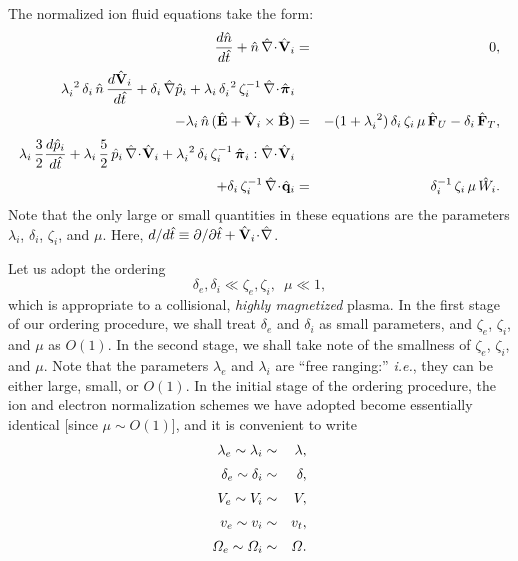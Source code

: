 The normalized ion fluid equations take the form:
\begin{eqnarray}\label{e3.116a}
\frac{d\hat{n}}{d\hat{t}} + \hat{n}\,\hat{\nabla}\!\cdot\!\hat{\bf V}_i &=&0,\\[0.5ex]
\lambda_i^{~2}\,\delta_i\,\hat{n}\,\frac{d\hat{\bf V}_i}{d\hat{t}} + \delta_i\,
\hat{\nabla}\hat{p}_i+ \lambda_i\,\delta_i^{~2}\,\zeta_i^{-1}\,\hat{\nabla}
\!\cdot\!\hat{\bpi}_i  \\[0.5ex]
-\lambda_i\,\hat{n}\,(\hat{\bf E} + \hat{\bf V}_i
\times\hat{\bf B}) &=& -(1+\lambda_i^{~2})\,\delta_i\,\zeta_i\,\mu\,\hat{\bf F}_U
 - \delta_i
\,\hat{\bf F}_T, \nonumber\\[0.5ex]
\lambda_i\,\frac{3}{2}\frac{d\hat{p}_i}{d\hat{t}} + \lambda_i\,\frac{5}{2}\,
\hat{p}_i\,\hat{\nabla}\!\cdot\!\hat{\bf V}_i + \lambda_i^{~2}\,\delta_i\,
\zeta_i^{-1}\,\hat{\bpi}_i : \hat{\nabla}\!\cdot\!\hat{\bf V}_i&&\label{e3.116c}\\[0.5ex] 
+\delta_i\,\zeta_i^{-1} \,\hat{\nabla}\!\cdot\!\hat{\bf q}_{i}
&=& \delta_i^{-1}\,\zeta_i\,\mu\,\hat{W}_i. \nonumber
\end{eqnarray}
Note that the only large or small quantities in these equations are the
parameters $\lambda_i$, $\delta_i$, $\zeta_i$, and $\mu$. 
Here, $d/d\hat{t}\equiv\partial /\partial\hat{t} +
 \hat{\bf V}_i\!\cdot\!\hat{\nabla}$.

Let us adopt the ordering
\begin{equation}
\delta_e, \delta_i \ll \zeta_e, \zeta_i,\,\,\, \mu \ll 1,
\end{equation}
which is appropriate to a collisional, {\em highly magnetized}\/ plasma. 
In the first stage of our ordering procedure, we shall treat $\delta_e$ and $\delta_i$
as small parameters, and $\zeta_e$, $\zeta_i$, and $\mu$ as $O(1)$.
 In the second stage, we shall take note of the smallness of 
$\zeta_e$, $\zeta_i$, and $\mu$. Note that the parameters $\lambda_e$ and $\lambda_i$
are ``free ranging:'' {\em i.e.}, they can be either large, small, or $O(1)$. 
In the initial stage of the
ordering procedure, the ion and electron
normalization schemes we have adopted become  essentially
identical [since $\mu\sim O(1)$], and 
it is convenient to write 
\begin{eqnarray}
\lambda_e\sim \lambda_i&\sim & \lambda,\\[0.5ex]
\delta_e \sim \delta_i &\sim &\delta,\\[0.5ex]
V_e \sim V_i &\sim & V,\\[0.5ex]
v_e \sim v_i &\sim & v_t,\\[0.5ex]
{\mit\Omega}_e \sim {\mit\Omega}_i &\sim & {\mit\Omega}.
\end{eqnarray}


